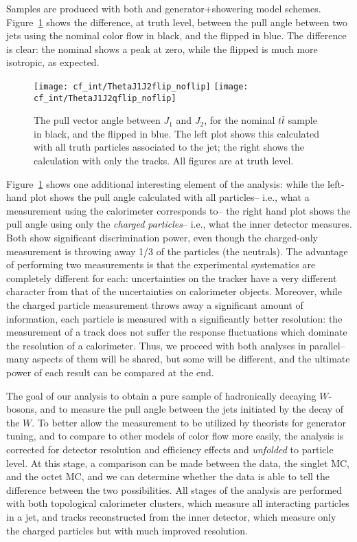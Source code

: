 Samples are produced with both \PowPythia and \PowHerwig generator+showering model schemes. Figure~\ref{fig:color:motivation:validation} shows the difference, at truth level, between the pull angle between two jets using the nominal color flow in black, and the flipped in blue. The difference is clear: the nominal shows a peak at zero, while the flipped is much more isotropic, as expected.

\begin{figure}
\begin{center}
\texttt{[image: cf\_int/ThetaJ1J2flip\_noflip]}
\texttt{[image: cf\_int/ThetaJ1J2qflip\_noflip]}
\caption{The pull vector angle between $J_1$ and $J_2$, for the nominal $t\bar{t}$ sample in black, and the flipped in blue. The left plot shows this calculated with all truth particles associated to the jet; the right shows the calculation with only the tracks. All figures are at truth level.}
\label{fig:color:motivation:validation}
\end{center}
\end{figure}

Figure~\ref{fig:color:motivation:validation} shows one additional interesting element of the analysis: while the left-hand plot shows the pull angle calculated with all particles-- i.e., what a measurement using the calorimeter corresponds to-- the right hand plot shows the pull angle using only the \textit{charged particles}-- i.e., what the inner detector measures. Both show significant discrimination power, even though the charged-only measurement is throwing away 1/3 of the particles (the neutrals). The advantage of performing two measurements is that the experimental systematics are completely different for each: uncertainties on the tracker have a very different character from that of the uncertainties on calorimeter objects. Moreover, while the charged particle measurement throws away a significant amount of information, each particle is measured with a significantly better resolution: the \pt measurement of a track does not suffer the response fluctuations which dominate the resolution of a calorimeter. Thus, we proceed with both analyses in parallel-- many aspects of them will be shared, but some will be different, and the ultimate power of each result can be compared at the end.


The goal of our analysis to obtain a pure sample of hadronically decaying $W$-bosons, and to measure the pull angle between the jets initiated by the decay of the $W$. To better allow the measurement to be utilized by theorists for generator tuning, and to compare to other models of color flow more easily, the analysis is corrected for detector resolution and efficiency effects and \textit{unfolded} to particle level. At this stage, a comparison can be made between the data, the singlet MC, and the octet MC, and we can determine whether the data is able to tell the difference between the two possibilities. All stages of the analysis are performed with both topological calorimeter clusters, which measure all interacting particles in a jet, and tracks reconstructed from the inner detector, which measure only the charged particles but with much improved resolution.

